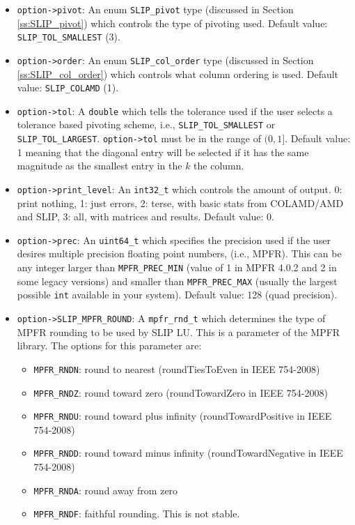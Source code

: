 \documentclass[12pt]{article}
\theoremstyle{definition}
\begin{document}
\begin{itemize}
\item
\verb|option->pivot|: An enum \verb|SLIP_pivot| type (discussed in Section
\ref{ss:SLIP_pivot}) which controls the type of pivoting used. Default value:
\verb|SLIP_TOL_SMALLEST| (3).

\item
\verb|option->order|: An enum \verb|SLIP_col_order| type (discussed in Section
\ref{ss:SLIP_col_order}) which controls what column ordering is used. Default
value: \verb|SLIP_COLAMD| (1).

\item
\verb|option->tol|: A \verb|double| which tells the tolerance used if the user
selects a tolerance based pivoting scheme, i.e., \verb|SLIP_TOL_SMALLEST| or
\verb|SLIP_TOL_LARGEST|. \verb|option->tol| must be in the range of $(0,1]$.
Default value: 1 meaning that the diagonal entry will be selected if it has the
same magnitude as the smallest entry in the $k$ the column.

\item
\verb|option->print_level|: An \verb|int32_t| which controls the amount of
output. 0: print nothing, 1: just errors, 2: terse, with basic stats from
COLAMD/AMD and SLIP, 3: all, with matrices and results. Default value: 0.

\item
\verb|option->prec|: An \verb|uint64_t| which specifies the precision used if
the user desires multiple precision floating point numbers, (i.e., MPFR). This
can be any integer larger than \verb|MPFR_PREC_MIN| (value of 1 in MPFR 4.0.2
and 2 in some legacy versions) and smaller than \verb|MPFR_PREC_MAX| (usually
the largest possible \verb'int' available in your system). Default value: 128
(quad precision).

\item
\verb|option->SLIP_MPFR_ROUND|: A \verb|mpfr_rnd_t| which determines the type
of MPFR rounding to be used by SLIP LU. This is a parameter of the MPFR
library. The options for this parameter are:

    \begin{itemize}
        \item \verb|MPFR_RNDN|: round to nearest
            (roundTiesToEven in IEEE 754-2008)
        \item \verb|MPFR_RNDZ|: round toward zero
            (roundTowardZero in IEEE 754-2008)
        \item \verb|MPFR_RNDU|: round toward plus infinity
            (roundTowardPositive in IEEE 754-2008)
        \item \verb|MPFR_RNDD|: round toward minus infinity
            (roundTowardNegative in IEEE 754-2008)
        \item \verb|MPFR_RNDA|: round away from zero
        \item \verb|MPFR_RNDF|: faithful rounding. This is not stable.
    \end{itemize}


\end{itemize}
\end{document}
